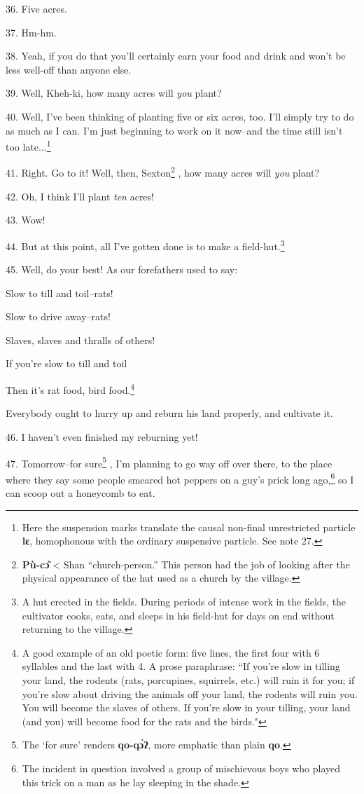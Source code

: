 36. Five acres.

37. Hm-hm.

38. Yeah, if you do that you'll certainly earn your food and drink and won't be
less well-off than anyone else.

39. Well, Kheh-ki, how many acres will \textit{you} plant?

40. Well, I've been thinking of planting five or six acres, too. I'll simply try
to do as much as I can. I'm just beginning to work on it now--and the time still
isn't too late...\footnote{Here the suspension marks translate the causal non-final unrestricted particle \textbf{lɛ}, homophonous with the ordinary suspensive particle. See note 27.}

41. Right. Go to it! Well, then, Sexton\footnote{\textbf{Pù-cɔ̂} < Shan ``church-person.'' This person had the job of looking after the physical appearance of the hut used as a church by the village.} , how many acres will \textit{you}
plant?

42. Oh, I think I'll plant \textit{ten} acres!

43. Wow!

44. But at this point, all I've gotten done is to make a field-hut.\footnote{A hut erected in the fields. During periods of intense work in the fields, the cultivator cooks, eats, and sleeps in his field-hut for days on end without returning to the village.}

45. Well, do your best! As our forefathers used to say:

Slow to till and toil--rats!

Slow to drive away--rats!

Slaves, slaves and thralls of others!

If you're slow to till and toil

Then it's rat food, bird food.\footnote{A good example of an old poetic form: five lines, the first four with 6 syllables and the last with 4. A prose paraphrase: ``If you're slow in tilling your land, the rodents (rats, porcupines, squirrels, etc.) will ruin it for you; if you're slow about driving the animals off your land, the rodents will ruin you. You will become the slaves of others. If you're slow in your tilling, your land (and you) will become food for the rats and the birds."}

Everybody ought to hurry up and reburn his land properly, and cultivate it.

46. I haven't even finished my reburning yet!

47. Tomorrow--for sure\footnote{The `for sure' renders \textbf{qo-qɔ̀ʔ}, more emphatic than plain \textbf{qo}.} , I'm planning to go way off over there, to the place
where they say some people smeared hot peppers on a guy's prick long ago,\footnote{The incident in question involved a group of mischievous boys who played this trick on a man as he lay sleeping in the shade.}
so I can scoop out a honeycomb to eat.

